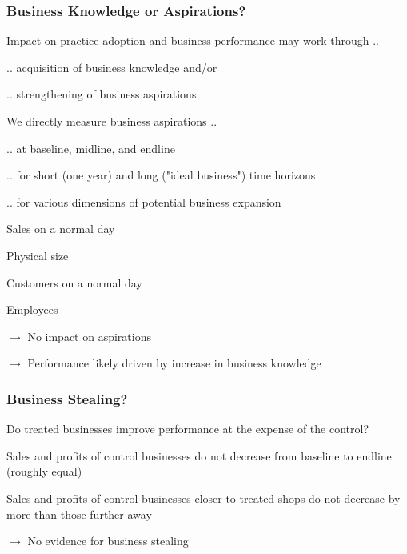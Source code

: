 \documentclass[hideothersubsections, usenames,dvipsnames,11pt]{beamer}
\newenvironment{itemize_2pt}{\itemize\addtolength{\itemsep}{2pt}}{\enditemize}
\begin{document}
\begin{frame}
\frametitle{Business Knowledge or Aspirations?}
Impact on practice adoption and business performance may work through ..
\begin{itemize_2pt}
	\item .. acquisition of \textcolor{bdf}{business knowledge} and/or
	\item .. strengthening of \textcolor{bdf}{business aspirations}
\end{itemize_2pt}

\pause
\vspace{1.0em}

We directly measure \textcolor{bdf}{business aspirations} .. 
\begin{itemize_2pt}
	\item .. at baseline, midline, and endline
	\item .. for short (one year) and long ("ideal business") time horizons
	\item .. for various dimensions of potential business expansion
    \begin{itemize_2pt}
   		\item Sales on a normal day
    	\item Physical size
   		\item Customers on a normal day
    	\item Employees
    \end{itemize_2pt}
\item[] $\rightarrow$ \textcolor{bdf}{No impact on aspirations}
\item[] $\rightarrow$ Performance likely driven by increase in \textcolor{bdf}{business knowledge}
\end{itemize_2pt}

\end{frame}

\begin{frame}
\frametitle{Business Stealing?}
Do treated businesses improve performance at the expense of the control?
\vspace{0.1in}
\begin{itemize_2pt}
\item Sales and profits of \textcolor{bdf}{control businesses do not decrease} from baseline to endline (roughly equal)
\item Sales and profits of control businesses \textcolor{bdf}{closer to treated shops do not decrease by more} than those further away
\item[] $\rightarrow$ \textcolor{bdf}{No evidence for business stealing}
\end{itemize_2pt}
\end{frame}
\end{document}
